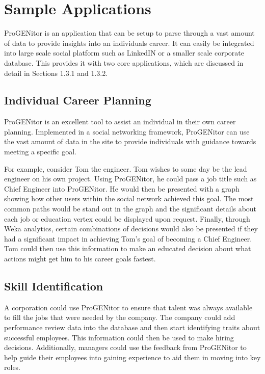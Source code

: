 \section{Sample Applications}
\label{sect:user-stories}
ProGENitor is an application that can be setup to parse through a vast amount
of data to provide insights into an individuals career.  It can easily be
integrated into large scale social platform such as LinkedIN or a smaller scale
corporate database.  This provides it with two core applications, which are
discussed in detail in Sections 1.3.1 and 1.3.2.

\subsection{Individual Career Planning}
ProGENitor is an excellent tool to assist an individual in their own career
planning.  Implemented in a social networking framework, ProGENitor can use the
vast amount of data in the site to provide individuals with
guidance towards meeting a specific goal.  

For example, consider Tom the engineer.  Tom wishes to some day be the lead
engineer on his own project.  Using ProGENitor, he could pass a job title such
as Chief Engineer into ProGENitor.  He would then be presented with a graph
showing how other users within the social network achieved this goal.  The most
common paths would be stand out in the graph and the significant details about
each job or education vertex could be displayed upon request.  Finally, through
Weka analytics, certain combinations of decisions would also be presented if
they had a significant impact in achieving Tom's goal of becoming a Chief
Engineer.  Tom could then use this information to make an  educated decision
about what actions might get him to his career goals fastest.

\subsection{Skill Identification}
A corporation could use ProGENitor to ensure that talent was always
available to fill the jobs that were needed by the company.  The company could
add performance review data into the database and then start identifying traits
about successful employees.  This information could then be used to make hiring
decisions.  Additionally, managers could use the feedback from ProGENitor to
help guide their employees into gaining experience to aid them in moving into
key roles.
	
